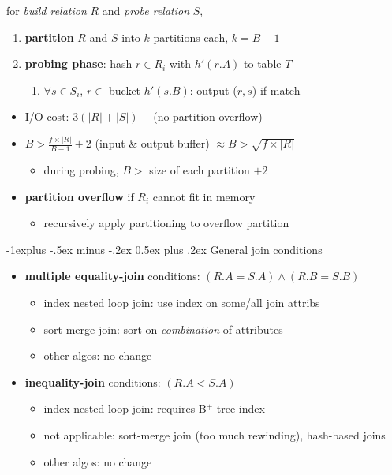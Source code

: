 \documentclass[9pt, landscape]{extarticle}
\makeatletter
\renewcommand{\subsection}{\@startsection{subsection}{2}{0mm}%
  {-1explus -.5ex minus -.2ex}%
  {0.5ex plus .2ex}%
{\normalfont\normalsize\bfseries}}
\makeatother
\begin{document}
\begin{multicols*}{4}
  for \textit{build relation} $R$ and \textit{probe relation} $S$,
  \begin{enumerate}
    \item \textbf{partition} $R$ and $S$ into  $k$ partitions each, $k=B-1$
    \item \textbf{probing phase}: hash $r \in R_i$ with $h'(r.A)$ to table $T$
      \begin{enumerate}
        \item $\forall s \in S_i$, $r \in$ bucket $h'(s.B)$: output ($r,s$) if match
      \end{enumerate}
  \end{enumerate}

  \begin{itemize}
    \item I/O cost: $3(|R|+|S|) \quad$ (no partition overflow)
    \item $B > \frac{f \times |R|}{B-1} + 2$ (input \& output buffer) $\approx B > \sqrt{f\times |R|}$
      \begin{itemize}
        \item during probing, $B >$ size of each partition $+ 2$
      \end{itemize}
    \item \textbf{partition overflow} if $R_i$ cannot fit in memory
      \begin{itemize}
        \item recursively apply partitioning to overflow partition
      \end{itemize}
  \end{itemize}

  \subsection{General join conditions}

  \begin{itemize}
    \item \textbf{multiple equality-join} conditions: $(R.A = S.A) \land (R.B=S.B)$
      \begin{itemize}
        \item index nested loop join: use index on some/all join attribs
        \item sort-merge join: sort on \textit{combination} of attributes
        \item other algos: no change
      \end{itemize}
    \item \textbf{inequality-join} conditions: $(R.A<S.A)$
      \begin{itemize}
        \item index nested loop join: requires B$^+$-tree index
        \item not applicable: sort-merge join (too much rewinding), hash-based joins
        \item other algos: no change
      \end{itemize}
  \end{itemize}


\end{multicols*}
\end{document}
